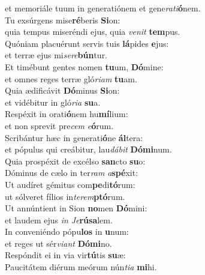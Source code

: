 \oddverse et memoriále tuum in generatiónem et gene\textit{ra}\textit{ti}\textbf{ó}nem.\\
\evenverse Tu exsúrgens mise\textbf{ré}beris \textbf{Si}on:~\*\\
\evenverse quia tempus miseréndi ejus, quia \textit{ve}\textit{nit} \textbf{tem}pus.\\
\oddverse Quóniam placuérunt servis tuis \textbf{lá}pides \textbf{e}jus:~\*\\
\oddverse et terræ ejus mi\textit{se}\textit{re}\textbf{bún}tur.\\
\evenverse Et timébunt gentes nomen \textbf{tu}um, \textbf{Dó}mine:~\*\\
\evenverse et omnes reges terræ gló\textit{ri}\textit{am} \textbf{tu}am.\\
\oddverse Quia ædificávit \textbf{Dó}minus \textbf{Si}on:~\*\\
\oddverse et vidébitur in gló\textit{ri}\textit{a} \textbf{su}a.\\
\evenverse Respéxit in orati\textbf{ó}nem hu\textbf{mí}lium:~\*\\
\evenverse et non sprevit pre\textit{cem} \textit{e}\textbf{ó}rum.\\
\oddverse Scribántur hæc in generati\textbf{ó}ne \textbf{ál}tera:~\*\\
\oddverse et pópulus qui creábitur, lau\textit{dá}\textit{bit} \textbf{Dó}\textbf{mi}num.\\
\evenverse Quia prospéxit de excélso \textbf{san}cto \textbf{su}o:~\*\\
\evenverse Dóminus de cælo in ter\textit{ram} \textit{a}\textbf{spé}xit:\\
\oddverse Ut audíret gémitus com\textbf{pe}di\textbf{tó}rum:~\*\\
\oddverse ut sólveret fílios in\textit{te}\textit{rem}\textbf{ptó}rum.\\
\evenverse Ut annúntient in Sion \textbf{no}men \textbf{Dó}mini:~\*\\
\evenverse et laudem ejus \textit{in} \textit{Je}\textbf{rú}\textbf{sa}lem.\\
\oddverse In conveniéndo pópu\textbf{los} in \textbf{u}num:~\*\\
\oddverse et reges ut sér\textit{vi}\textit{ant} \textbf{Dó}\textbf{mi}no.\\
\evenverse Respóndit ei in via vir\textbf{tú}tis \textbf{su}æ:~\*\\
\evenverse Paucitátem diérum meórum nún\textit{ti}\textit{a} \textbf{mi}hi.\\
